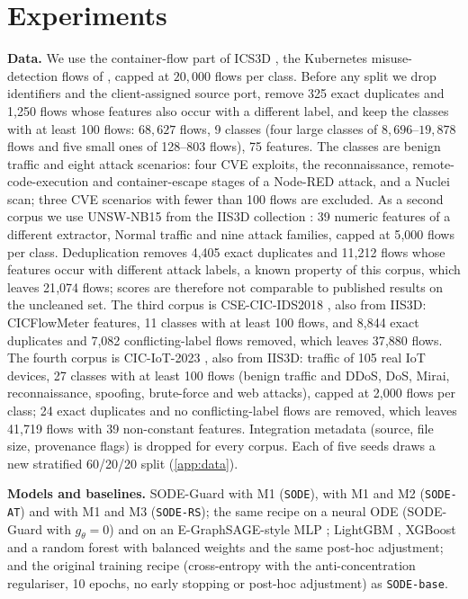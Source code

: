 \section{Experiments}\label{sec:exp}
\textbf{Data.} We use the container-flow part of ICS3D \citep{anaedevha2025ics3d}, the
Kubernetes misuse-detection flows of \citet{amin2024misuse}, capped at
$20{,}000$ flows per class. Before
any split we drop identifiers and the client-assigned source port, remove 325
exact duplicates and 1{,}250 flows whose features also occur with a different
label, and keep the classes with at least 100 flows: $68{,}627$ flows, 9 classes
(four large classes of $8{,}696$--$19{,}878$ flows and five small ones of
128--803 flows), 75 features. The classes are benign traffic and eight attack
scenarios: four CVE exploits, the reconnaissance, remote-code-execution and
container-escape stages of a Node-RED attack, and a Nuclei scan; three CVE
scenarios with fewer than 100 flows are excluded. As a second corpus we use
UNSW-NB15 \citep{moustafa2015unsw} from the IIS3D collection \citep{anaedevha2025iis3d}:
39 numeric features of a different extractor, Normal traffic and nine attack
families, capped at 5{,}000 flows per class. Deduplication removes 4{,}405 exact
duplicates and 11{,}212 flows whose features occur with different attack labels,
a known property of this corpus, which leaves 21{,}074 flows; scores are
therefore not comparable to published results on the uncleaned set. The third
corpus is CSE-CIC-IDS2018 \citep{sharafaldin2018cicids}, also from IIS3D:
CICFlowMeter features, 11 classes with at least 100 flows, and 8{,}844 exact
duplicates and 7{,}082 conflicting-label flows removed, which leaves 37{,}880
flows. The fourth corpus is CIC-IoT-2023 \citep{neto2023ciciot}, also from IIS3D:
traffic of 105 real IoT devices, 27 classes with at least 100 flows (benign
traffic and DDoS, DoS, Mirai, reconnaissance, spoofing, brute-force and web
attacks), capped at 2{,}000 flows per class; 24 exact duplicates and no
conflicting-label flows are removed, which leaves 41{,}719 flows with 39
non-constant features. Integration metadata (source, file size, provenance flags) is dropped
for every corpus. Each of five seeds draws a new stratified
60/20/20 split (\cref{app:data}).

\textbf{Models and baselines.} SODE-Guard with M1 (\texttt{SODE}), with M1 and
M2 (\texttt{SODE-AT}) and with M1 and M3 (\texttt{SODE-RS}); the same recipe on
a neural ODE (SODE-Guard with $g_\theta=0$) and on an E-GraphSAGE-style MLP
\citep{lo2022egraphsage}; LightGBM \citep{ke2017lightgbm}, XGBoost
\citep{chen2016xgboost} and a random forest \citep{breiman2001rf} with balanced
weights and the same post-hoc adjustment; and the original training recipe
(cross-entropy with the anti-concentration regulariser, 10 epochs, no early
stopping or post-hoc adjustment) as \texttt{SODE-base}.

